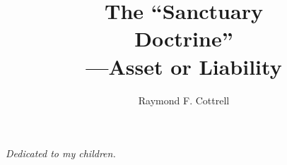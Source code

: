 \documentclass{tufte-book}
\title{The ``Sanctuary\\Doctrine''\\---Asset or Liability}
\author{Raymond F. Cottrell}
\newcommand{\blankpage}{\newpage\hbox{}\thispagestyle{empty}\newpage}
\begin{document}
\frontmatter

\blankpage

\maketitle

\tableofcontents

\listoftables

\cleardoublepage
\vfill
\begin{doublespace}
    \noindent\fontsize{18}{22}\selectfont\itshape
    \nohyphenation
    Dedicated to my children.
\end{doublespace}
\vfill
\vfill

\cleardoublepage



\mainmatter






\backmatter

\renewcommand{\bibpreamble}{Most of my papers cited in the following notes are 
on file in the Heritage
Room of the Del E.\ Webb Library on the campus of Loma Linda University. The
Association of Adventist Forums is currently planning a website and has
requested a list of all my major papers.}




\end{document}
